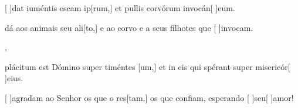 {    {\item {}[ ]{dat} iuméntis escam ip[rum,] et pullis corvórum invocán[ ]{e}um.}%
        {\item {} dá aos animais seu ali[to,] e ao corvo e a seus filhotes que [ ]{in}{vo}cam.},
    {\item {}plácitum est Dómino super timéntes [um,] et in eis qui spérant super misericór[ ]{e}ius.}
        {\item {}[ ]{a}gradam ao Senhor os que o res[tam,] os que confiam, esperando [ ]{seu}[ ]{a}mor!}
}